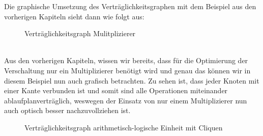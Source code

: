 \documentclass[conference]{IEEEtran}
\begin{document}
Die graphische Umsetzung des Verträglichkeitsgraphen mit dem Beispiel aus den vorherigen Kapiteln sieht dann wie folgt aus: 
\begin{figure}[h]
\caption{Verträglichkeitsgraph Mulitplizierer}
\label{fig.2}
\end{figure}\\
Aus den vorherigen Kapiteln, wissen wir bereits, dass für die Optimierung der Verschaltung nur ein Multiplizierer benötigt wird und genau das können wir in diesem Beispiel nun auch grafisch betrachten. Zu sehen ist, dass jeder Knoten mit einer Kante verbunden ist und somit sind alle Operationen miteinander ablaufplanverträglich, weswegen der Einsatz von nur einem Multiplizierer nun auch optisch besser nachzuvollziehen ist.\\
\begin{figure}[h]
\caption{Verträglichkeitsgraph arithmetisch-logische Einheit mit Cliquen}
\label{fig.4}
\end{figure}
\end{document}
